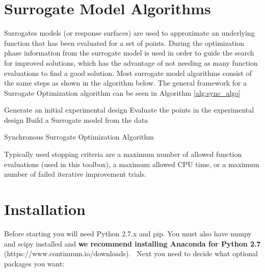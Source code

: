 \documentclass[]{article}
\begin{document}
\section{Surrogate Model Algorithms}
Surrogates models (or response surfaces) are used to approximate an underlying function that has 
been evaluated for a set of points. During the optimization phase information from the surrogate model 
is used in order to guide the search for improved solutions, which has the advantage of not needing as
many function evaluations to find a good solution. Most surrogate model algorithms consist of the same 
steps as shown in the algorithm below. The general framework for a Surrogate Optimization algorithm 
can be seen in Algorithm \ref{alg:sync_algo}

\begin{algorithm}[!h]
\LinesNumbered
{}

	Generate an initial experimental design\;{\label{restart}}
	Evaluate the points in the experimental design\;
	Build a Surrogate model from the data\;
\caption{Synchronous Surrogate Optimization Algorithm}
\label{alg:sync_algo}
\end{algorithm} 

\noindent Typically used stopping criteria are a maximum number of allowed function evaluations 
(used in this toolbox), a maximum allowed CPU time, or a maximum number of failed iterative 
improvement trials.

\section{Installation}
Before starting you will need Python 2.7.x and pip. You must also have numpy and scipy 
installed and \textbf{we recommend installing Anaconda for Python 2.7} \newline 
(https://www.continuum.io/downloads). \newline \ \newline Next you need to decide what 
optional packages you want:
\end{document}
